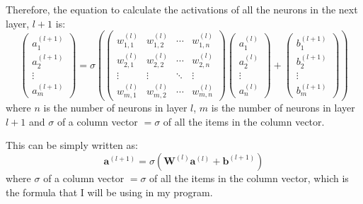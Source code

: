 \documentclass[12pt]{report}
\begin{document}
Therefore, the equation to calculate the activations of all the neurons in the next layer, $l+1$ is:
\begin{equation}
    \begin{pmatrix}a^{\left(l+1\right)}_1\\[0.3em]a^{\left(l+1\right)}_2\\\vdots \\a^{\left(l+1\right)}_m\end{pmatrix}=\sigma \left(\begin{pmatrix}w^{\left(l\right)}_{1,1}&w^{\left(l\right)}_{1,2}&\cdots&w^{\left(l\right)}_{1,n}\\[0.3em]w^{\left(l\right)}_{2,1}&w^{\left(l\right)}_{2,2}&\cdots&w^{\left(l\right)}_{2,n}\\\vdots&\vdots&\ddots&\vdots\\w^{\left(l\right)}_{m,1}&w^{\left(l\right)}_{m,2}&\cdots&w^{\left(l\right)}_{m,n}\end{pmatrix}\begin{pmatrix}a^{\left(l\right)}_1\\[0.3em]a^{\left(l\right)}_2\\\vdots \\a^{\left(l\right)}_n\end{pmatrix}+\begin{pmatrix}b^{\left(l+1\right)}_1\\[0.3em]b^{\left(l+1\right)}_2\\\vdots \\b^{\left(l+1\right)}_m\end{pmatrix}\right)
\end{equation}
where $n$ is the number of neurons in layer $l$, $m$ is the number of neurons in layer $l+1$ and $\sigma$ of a column vector $=\sigma$ of all the items in the column vector.

This can be simply written as:
\begin{equation}
    \mathbf{a}^{\left(l+1\right)}=\sigma \left(\mathbf{W}^{\left(l\right)}\mathbf{a}^{\left(l\right)}+\mathbf{b}^{\left(l+1\right)}\right)
\end{equation}
where $\sigma$ of a column vector $=\sigma$ of all the items in the column vector, which is the formula that I will be using in my program.
\end{document}
